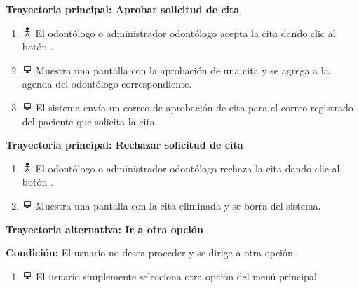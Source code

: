 \textbf{Trayectoria principal: Aprobar solicitud de cita}
\begin{enumerate}
\item \includegraphics[height=1em]{pictures/actor.png} El odontólogo o administrador odontólogo acepta la cita dando clic al botón  .
\item \includegraphics[height=1em]{pictures/sistema.png} Muestra una pantalla con la aprobación de una cita y se agrega a la agenda del odontólogo correspondiente.
\item \includegraphics[height=1em]{pictures/sistema.png} El sistema envía un correo de aprobación de cita para el correo registrado del paciente que solicita la cita.
\end{enumerate} \bigskip

\textbf{Trayectoria principal: Rechazar solicitud de cita}
\begin{enumerate}
\item \includegraphics[height=1em]{pictures/actor.png} El odontólogo o administrador odontólogo rechaza la cita dando clic al botón  .
\item \includegraphics[height=1em]{pictures/sistema.png} Muestra una pantalla con la cita eliminada y se borra del sistema.

\end{enumerate} \bigskip

\textbf{Trayectoria alternativa: Ir a otra opción} 

\vspace{0.3em}

\textbf{Condición:} El usuario no desea proceder y se dirige a otra opción.
\begin{enumerate}
\item \includegraphics[height=1em]{pictures/sistema.png} El usuario simplemente selecciona otra opción del menú principal.
\end{enumerate} \bigskip

